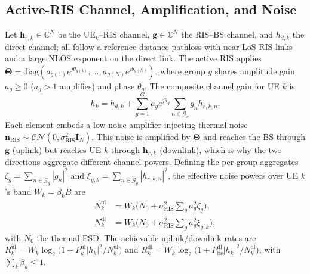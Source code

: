 \documentclass[conference]{IEEEtran}
\newcommand{\C}{\mathbb{C}}
\begin{document}
\subsection{Active-RIS Channel, Amplification, and Noise}
Let $\mathbf{h}_{r,k}\in\C^{N}$ be the UE$_k$--RIS channel, $\mathbf{g}\in\C^N$ the
RIS--BS channel, and $h_{d,k}$ the direct channel; all follow a
reference-distance pathloss with near-LoS RIS links and a large NLOS exponent on
the direct link. The active RIS applies $\boldsymbol{\Theta}=\mathrm{diag}(a_{g(1)}e^{j\theta_{g(1)}},\dots,a_{g(N)}e^{j\theta_{g(N)}})$,
where group $g$ shares amplitude gain $a_g\ge 0$ ($a_g>1$ amplifies) and phase
$\theta_g$. The composite channel gain for UE $k$ is
\begin{equation}
h_k=h_{d,k}+\sum_{g=1}^{G}a_g e^{j\theta_g}\!\!\sum_{n\in\mathcal{G}_g}\! g_n h_{r,k,n}.
\label{eq:hk}
\end{equation}
Each element embeds a low-noise amplifier injecting thermal noise
$\mathbf{n}_{\mathrm{RIS}}\sim\mathcal{CN}(0,\sigma_{\mathrm{RIS}}^2\mathbf{I}_N)$.
This noise is amplified by $\boldsymbol\Theta$ and reaches the BS through
$\mathbf{g}$ (uplink) but reaches UE $k$ through $\mathbf{h}_{r,k}$ (downlink),
which is why the two directions aggregate different channel powers. Defining the
per-group aggregates $\zeta_g=\sum_{n\in\mathcal{G}_g}|g_n|^2$ and
$\xi_{g,k}=\sum_{n\in\mathcal{G}_g}|h_{r,k,n}|^2$, the effective noise powers over
UE $k$'s band $W_k=\beta_k B$ are
\begin{align}
N_k^{\mathrm{ul}}&=W_k\Big(N_0+\sigma_{\mathrm{RIS}}^2\textstyle\sum_g a_g^2\zeta_g\Big),\label{eq:nul}\\
N_k^{\mathrm{dl}}&=W_k\Big(N_0+\sigma_{\mathrm{RIS}}^2\textstyle\sum_g a_g^2\xi_{g,k}\Big),\label{eq:ndl}
\end{align}
with $N_0$ the thermal PSD. The achievable uplink/downlink rates are
$R_k^{\mathrm{ul}}=W_k\log_2\!\big(1+P_k^{\mathrm{ul}}|h_k|^2/N_k^{\mathrm{ul}}\big)$
and $R_k^{\mathrm{dl}}=W_k\log_2\!\big(1+P_{\mathrm{bs}}^{\mathrm{dl}}|h_k|^2/N_k^{\mathrm{dl}}\big)$,
with $\sum_k\beta_k\le 1$.
\end{document}
